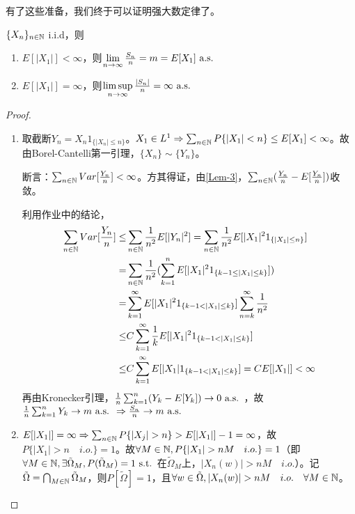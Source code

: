 \documentclass{ctexbook}
\begin{document}
有了这些准备，我们终于可以证明强大数定律了。

\begin{Thm}
  $\{X_{n}\}_{n\in\mathbb{N}}$ i.i.d，则
  \begin{enumerate}
  \item $E[|X_{1}|]<\infty$，则$\lim\limits_{n\to\infty}\frac{S_{n}}{n}=m=E[X_{1}] \text{ a.s. }$
  \item $E[|X_{1}|]=\infty$，则$\limsup\limits_{n\to\infty}\frac{|S_{n}|}{n}=\infty \text{ a.s. }$
  \end{enumerate}
\end{Thm}
\begin{proof}
  \begin{enumerate}
  \item 取截断$Y_{n}=X_{n}1_{\{|X_{n}|\leq n\}}$。$X_{1}\in L^{1}\Rightarrow \sum_{n\in\mathbb{N}}P\{|X_{1}|<n\}\leq E[X_{1}]<\infty$。故由Borel-Cantelli第一引理，$\{X_{n}\}\sim \{Y_{n}\}$。


    断言：$\sum_{n\in\mathbb{N}} Var[\frac{Y_{n}}{n}]<\infty$。方其得证，由\ref{Lem-3}，$\sum_{n\in\mathbb{N}}(\frac{Y_{n}}{n}-E[\frac{Y_{n}}{n}])$收敛。
    
    利用作业中的结论，
    \begin{align*}
      \sum_{n\in\N}Var[\frac{Y_{n}}{n}]\leq&\sum_{n\in\N}\frac{1}{n^{2}}E[|Y_{n}|^{2}]=\sum_{n\in\N}\frac{1}{n^{2}}E[|X_{1}|^{2}1_{\{|X_{1}|\leq n\}}]\\
      =&\sum_{n\in \N}\frac{1}{n^{2}}(\sum_{k=1}^{n}E[|X_{1}|^{2}1_{\{k-1\leq |X_{1}|\leq k\}}])\\
      =&\sum_{k=1}^{\infty}E[|X_{1}|^{2}1_{\{k-1<|X_{1}|\leq k\}}]\sum_{n=k}^{\infty}\frac{1}{n^{2}}\\
      \leq& C\sum_{k=1}^{\infty}\frac{1}{k}E[|X_{1}|^{2}1_{\{k-1<|X_{1}|\leq k\}}]\\
      \leq& C\sum_{k=1}^{\infty}E[|X_{1}|1_{\{k-1<|X_{1}|\leq k\}}]=CE[|X_{1}|]<\infty
\end{align*}
    再由Kronecker引理，$\frac{1}{n}\sum_{k=1}^{n}(Y_{k}-E[Y_{k}])\to 0\text{ a.s. }$，故$\frac{1}{n}\sum_{k=1}^{n}Y_{k}\to m\text{ a.s. }\Rightarrow \frac{S_{n}}{n}\to m\text{ a.s. }$

  \item $E[|X_{1}|]=\infty\Rightarrow\sum_{n\in\N}P\{|X_{j}|>n\}>E[|X_{1}|]-1=\infty$，故$P\{|X_{1}|>n\quad i.o.\}=1$。故$\forall M\in\N, P\{|X_{1}|>nM\quad i.o.\}=1$（即$\forall M\in\mathbb{N},\exists \tilde\Omega_{M},P(\tilde\Omega_{M})=1\text{ s.t. }$在$\tilde{\Omega}_{M}$上，$|X_{n}(w)|>nM\quad i.o.$）。记$\tilde\Omega=\bigcap_{M\in\mathbb{N}}\tilde{\Omega}_{M}$，则$P[\tilde{\Omega}]=1$，且$\forall w\in\tilde{\Omega}, |X_{n}(w)|>nM\quad i.o.\quad \forall M\in\N$。


\end{enumerate}
\end{proof}
\end{document}
